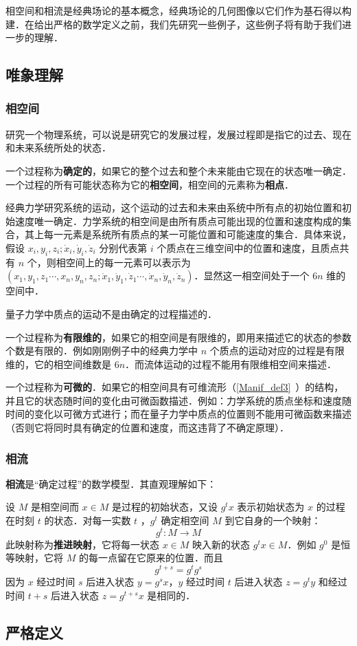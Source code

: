
相空间和相流是经典场论的基本概念，经典场论的几何图像以它们作为基石得以构建．在给出严格的数学定义之前，我们先研究一些例子，这些例子将有助于我们进一步的理解．
\subsection{唯象理解}
\subsubsection{相空间}
研究一个物理系统，可以说是研究它的发展过程，发展过程即是指它的过去、现在和未来系统所处的状态．

一个过程称为\textbf{确定的}，如果它的整个过去和整个未来能由它现在的状态唯一确定．一个过程的所有可能状态称为它的\textbf{相空间}，相空间的元素称为\textbf{相点}．

\begin{example}{}
经典力学研究系统的运动，这个运动的过去和未来由系统中所有点的初始位置和初始速度唯一确定．力学系统的相空间是由所有质点可能出现的位置和速度构成的集合，其上每一元素是系统所有质点的某一可能位置和可能速度的集合．具体来说，假设 $x_{i},y_i,z_i;\dot{x}_i,\dot{y}_i,\dot z_i$ 分别代表第 $i$ 个质点在三维空间中的位置和速度，且质点共有 $n$ 个，则相空间上的每一元素可以表示为 $(x_1,y_1,z_1\cdots,x_n,y_n,z_n;\dot x _1,\dot y_1,\dot z_1\cdots,\dot x_n,\dot y_n,\dot z_n)$．显然这一相空间处于一个 $6n$ 维的空间中．

量子力学中质点的运动不是由确定的过程描述的．
\end{example}

一个过程称为\textbf{有限维的}，如果它的相空间是有限维的，即用来描述它的状态的参数个数是有限的．例如刚刚例子中的经典力学中 $n$ 个质点的运动对应的过程是有限维的，它的相空间维数是 $6n$．而流体运动的过程不能用有限维相空间来描述．

一个过程称为\textbf{可微的}．如果它的相空间具有可维流形（\autoref{Manif_def3}~）的结构，并且它的状态随时间的变化由可微函数描述．例如：力学系统的质点坐标和速度随时间的变化以可微方式进行；而在量子力学中质点的位置则不能用可微函数来描述（否则它将同时具有确定的位置和速度，而这违背了不确定原理）．
\subsubsection{相流}
\textbf{相流}是“确定过程”的数学模型．其直观理解如下：

设 $M$ 是相空间而 $x\in M$ 是过程的初始状态，又设 $g^t x$ 表示初始状态为 $x$ 的过程在时刻 $t$ 的状态．对每一实数 $t$ ，$g^t$ 确定相空间 $M$ 到它自身的一个映射：
\begin{equation}
g^t:M\rightarrow M
\end{equation}
此映射称为\textbf{推进映射}，它将每一状态 $x\in M$ 映入新的状态 $g^t x\in M$．例如 $g^0$ 是恒等映射，它将 $M$ 的每一点留在它原来的位置．而且
\begin{equation}
g^{t+s}=g^tg^s
\end{equation}
因为 $x$ 经过时间 $s$ 后进入状态 $y=g^s x$，$y$ 经过时间 $t$ 后进入状态 $z=g^t y$ 和经过时间 $t+s$ 后进入状态 $z=g^{t+s} x$ 是相同的．


\subsection{严格定义}
